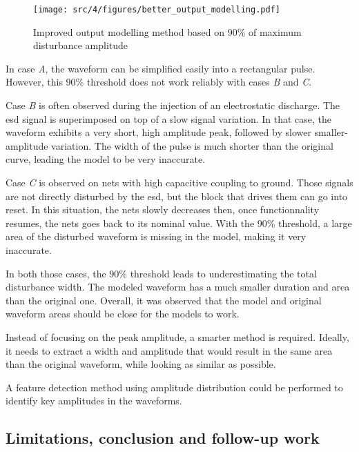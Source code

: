 \begin{figure}[!h]
  \centering
  \texttt{[image: src/4/figures/better\_output\_modelling.pdf]}
  \caption{Improved output modelling method based on 90\% of maximum disturbance amplitude}
  \label{fig:impact-single-failure-criteria}
\end{figure}

In case \textit{A}, the waveform can be simplified easily into a rectangular pulse.
However, this 90\% threshold does not work reliably with cases \textit{B} and \textit{C}.

Case \textit{B} is often observed during the injection of an electrostatic discharge.
The \gls{esd} signal is superimposed on top of a slow signal variation.
In that case, the waveform exhibits a very short, high amplitude peak, followed by slower smaller-amplitude variation.
The width of the pulse is much shorter than the original curve, leading the model to be very inaccurate.

Case \textit{C} is observed on nets with high capacitive coupling to ground.
Those signals are not directly disturbed by the \gls{esd}, but the block that drives them can go into reset.
In this situation, the nets slowly decreases then, once functionnality resumes, the nets goes back to its nominal value.
With the 90\% threshold, a large area of the disturbed waveform is missing in the model, making it very inaccurate.

In both those cases, the 90\% threshold leads to underestimating the total disturbance width.
The modeled waveform has a much smaller duration and area than the original one.
Overall, it was observed that the model and original waveform areas should be close for the models to work.

Instead of focusing on the peak amplitude, a smarter method is required.
Ideally, it needs to extract a width and amplitude that would result in the same area than the original waveform, while looking as similar as possible.

A feature detection method using amplitude distribution could be performed to identify key amplitudes in the waveforms.

\subsection{Limitations, conclusion and follow-up work}

